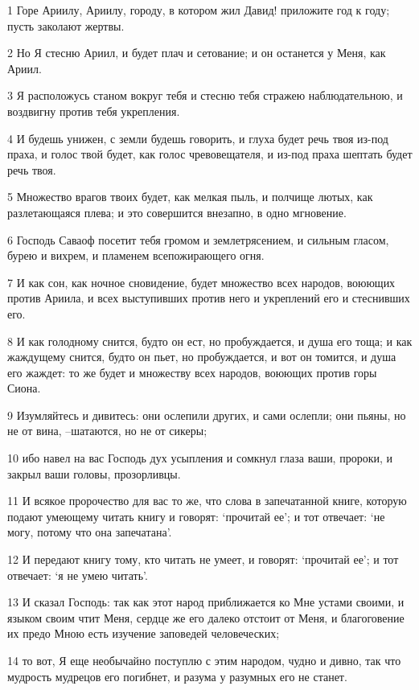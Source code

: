\par 1 Горе Ариилу, Ариилу, городу, в котором жил Давид! приложите год к году; пусть заколают жертвы.
\par 2 Но Я стесню Ариил, и будет плач и сетование; и он останется у Меня, как Ариил.
\par 3 Я расположусь станом вокруг тебя и стесню тебя стражею наблюдательною, и воздвигну против тебя укрепления.
\par 4 И будешь унижен, с земли будешь говорить, и глуха будет речь твоя из-под праха, и голос твой будет, как голос чревовещателя, и из-под праха шептать будет речь твоя.
\par 5 Множество врагов твоих будет, как мелкая пыль, и полчище лютых, как разлетающаяся плева; и это совершится внезапно, в одно мгновение.
\par 6 Господь Саваоф посетит тебя громом и землетрясением, и сильным гласом, бурею и вихрем, и пламенем всепожирающего огня.
\par 7 И как сон, как ночное сновидение, будет множество всех народов, воюющих против Ариила, и всех выступивших против него и укреплений его и стеснивших его.
\par 8 И как голодному снится, будто он ест, но пробуждается, и душа его тоща; и как жаждущему снится, будто он пьет, но пробуждается, и вот он томится, и душа его жаждет: то же будет и множеству всех народов, воюющих против горы Сиона.
\par 9 Изумляйтесь и дивитесь: они ослепили других, и сами ослепли; они пьяны, но не от вина, --шатаются, но не от сикеры;
\par 10 ибо навел на вас Господь дух усыпления и сомкнул глаза ваши, пророки, и закрыл ваши головы, прозорливцы.
\par 11 И всякое пророчество для вас то же, что слова в запечатанной книге, которую подают умеющему читать книгу и говорят: `прочитай ее'; и тот отвечает: `не могу, потому что она запечатана'.
\par 12 И передают книгу тому, кто читать не умеет, и говорят: `прочитай ее'; и тот отвечает: `я не умею читать'.
\par 13 И сказал Господь: так как этот народ приближается ко Мне устами своими, и языком своим чтит Меня, сердце же его далеко отстоит от Меня, и благоговение их предо Мною есть изучение заповедей человеческих;
\par 14 то вот, Я еще необычайно поступлю с этим народом, чудно и дивно, так что мудрость мудрецов его погибнет, и разума у разумных его не станет.
